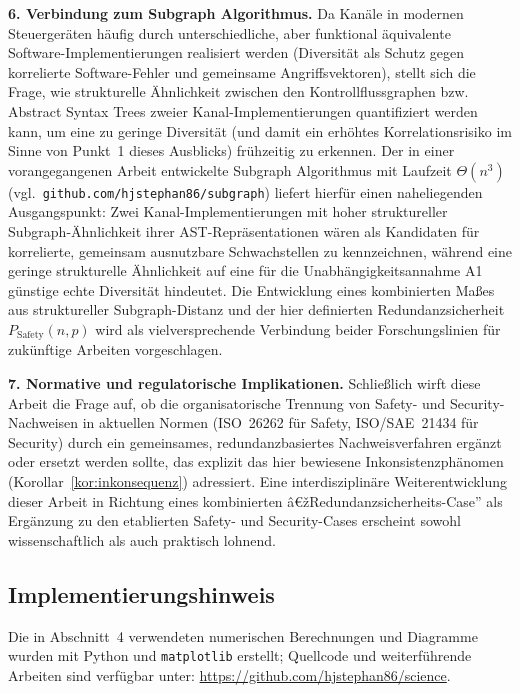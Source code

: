 ﻿\documentclass[a4paper,12pt]{article}
\theoremstyle{definition}
\begin{document}
\textbf{6. Verbindung zum Subgraph Algorithmus.} Da Kanäle in modernen Steuergeräten häufig durch unterschiedliche, aber funktional äquivalente Software-Implementierungen realisiert werden (Diversität als Schutz gegen korrelierte Software-Fehler und gemeinsame Angriffsvektoren), stellt sich die Frage, wie strukturelle Ähnlichkeit zwischen den Kontrollflussgraphen bzw. Abstract Syntax Trees zweier Kanal-Implementierungen quantifiziert werden kann, um eine zu geringe Diversität (und damit ein erhöhtes Korrelationsrisiko im Sinne von Punkt~1 dieses Ausblicks) frühzeitig zu erkennen. Der in einer vorangegangenen Arbeit entwickelte Subgraph Algorithmus mit Laufzeit $\Theta(n^3)$ (vgl.\ \texttt{github.com/hjstephan86/subgraph}) liefert hierfür einen naheliegenden Ausgangspunkt: Zwei Kanal-Implementierungen mit hoher struktureller Subgraph-Ähnlichkeit ihrer AST-Repräsentationen wären als Kandidaten für korrelierte, gemeinsam ausnutzbare Schwachstellen zu kennzeichnen, während eine geringe strukturelle Ähnlichkeit auf eine für die Unabhängigkeitsannahme A1 günstige echte Diversität hindeutet. Die Entwicklung eines kombinierten Maßes aus struktureller Subgraph-Distanz und der hier definierten Redundanzsicherheit $P_{\mathrm{Safety}}(n,p)$ wird als vielversprechende Verbindung beider Forschungslinien für zukünftige Arbeiten vorgeschlagen.

\textbf{7. Normative und regulatorische Implikationen.} Schließlich wirft diese Arbeit die Frage auf, ob die organisatorische Trennung von Safety- und Security-Nachweisen in aktuellen Normen (ISO~26262 für Safety, ISO/SAE~21434 für Security) durch ein gemeinsames, redundanzbasiertes Nachweisverfahren ergänzt oder ersetzt werden sollte, das explizit das hier bewiesene Inkonsistenzphänomen (Korollar~\ref{kor:inkonsequenz}) adressiert. Eine interdisziplinäre Weiterentwicklung dieser Arbeit in Richtung eines kombinierten â€žRedundanzsicherheits-Case'' als Ergänzung zu den etablierten Safety- und Security-Cases erscheint sowohl wissenschaftlich als auch praktisch lohnend.

\subsection{Implementierungshinweis}

Die in Abschnitt~4 verwendeten numerischen Berechnungen und Diagramme wurden mit Python und \texttt{matplotlib} erstellt; Quellcode und weiterführende Arbeiten sind verfügbar unter: \url{https://github.com/hjstephan86/science}.
\end{document}
